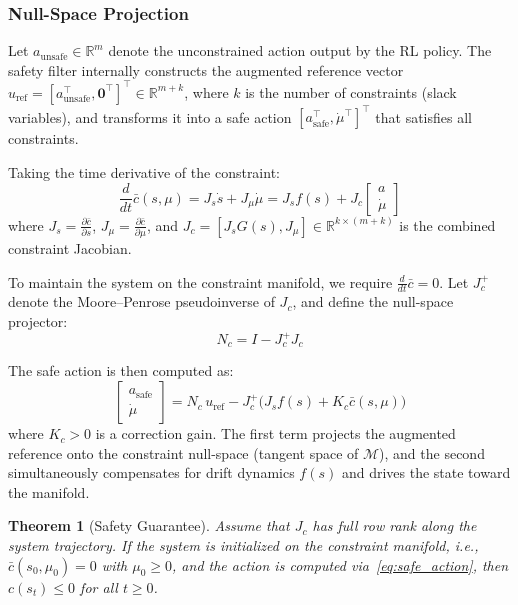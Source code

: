 \documentclass[letterpaper, 10 pt, conference]{ieeeconf}
\newtheorem{theorem}{Theorem}
\begin{document}
\subsubsection{Null-Space Projection}

Let $a_{\text{unsafe}} \in \mathbb{R}^m$ denote the unconstrained action output by the RL policy. The safety filter internally constructs the augmented reference vector $u_{\text{ref}} = [a_{\text{unsafe}}^\top, \mathbf{0}^\top]^\top \in \mathbb{R}^{m+k}$, where $k$ is the number of constraints (slack variables), and transforms it into a safe action $[a_{\text{safe}}^\top, \dot{\mu}^\top]^\top$ that satisfies all constraints.

Taking the time derivative of the constraint:
\begin{equation}
    \frac{d}{dt} \bar{c}(s, \mu) = J_s \dot{s} + J_\mu \dot{\mu} = J_s f(s) + J_c \begin{bmatrix} a \\ \dot{\mu} \end{bmatrix}
    \label{eq:constraint_deriv}
\end{equation}
where $J_s = \frac{\partial \bar{c}}{\partial s}$, $J_\mu = \frac{\partial \bar{c}}{\partial \mu}$, and $J_c = [J_s G(s), J_\mu] \in \mathbb{R}^{k \times (m+k)}$ is the combined constraint Jacobian.

To maintain the system on the constraint manifold, we require $\frac{d}{dt}\bar{c} = 0$. Let $J_c^+$ denote the Moore--Penrose pseudoinverse of $J_c$, and define the null-space projector:
\begin{equation}
    N_c = I - J_c^+ J_c
\end{equation}

The safe action is then computed as:
\begin{equation}
    \begin{bmatrix} a_{\text{safe}} \\ \dot{\mu} \end{bmatrix} = N_c \, u_{\text{ref}} - J_c^+ \bigl( J_s f(s) + K_c \bar{c}(s, \mu) \bigr)
    \label{eq:safe_action}
\end{equation}
where $K_c > 0$ is a correction gain. The first term projects the augmented reference onto the constraint null-space (tangent space of $\mathcal{M}$), and the second simultaneously compensates for drift dynamics $f(s)$ and drives the state toward the manifold.

\begin{theorem}[Safety Guarantee]
\label{thm:safety}
Assume that $J_c$ has full row rank along the system trajectory. If the system is initialized on the constraint manifold, i.e., $\bar{c}(s_0, \mu_0) = 0$ with $\mu_0 \geq 0$, and the action is computed via~\eqref{eq:safe_action}, then $c(s_t) \leq 0$ for all $t \geq 0$.
\end{theorem}
\end{document}
